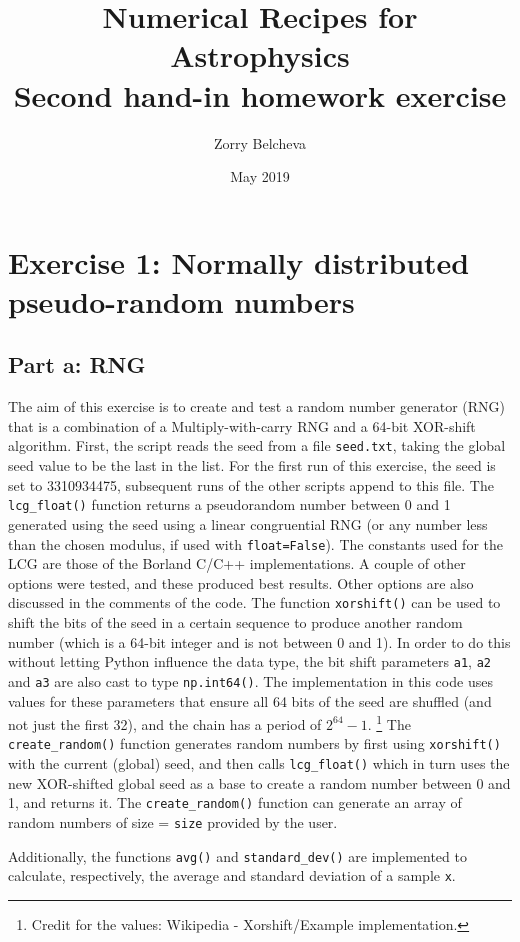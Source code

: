\documentclass{article}
\title{Numerical Recipes for Astrophysics \\ Second hand-in homework exercise}
\author{Zorry Belcheva}
\date{May 2019}
\begin{document}
\maketitle

\section{Exercise 1: Normally distributed pseudo-random numbers}

\subsection{Part a: RNG}
The aim of this exercise is to create and test a random number generator (RNG) that is a combination of a Multiply-with-carry RNG and a 64-bit XOR-shift algorithm. First, the script reads the seed from a file \verb+seed.txt+, taking the global seed value to be the last in the list. For the first run of this exercise, the seed is set to 3310934475, subsequent runs of the other scripts append to this file. The \verb+lcg_float()+ function returns a pseudorandom number between 0 and 1 generated using the seed using a linear congruential RNG (or any number less than the chosen modulus, if used with \verb+float=False+). The constants used for the LCG are those of the Borland C/C++ implementations. A couple of other options were tested, and these produced best results. Other options are also discussed in the comments of the code. The function \verb+xorshift()+ can be used to shift the bits of the seed in a certain sequence to produce another random number (which is a 64-bit integer and is not between 0 and 1). In order  to do this without letting Python influence the data type, the bit shift parameters \verb+a1+, \verb+a2+ and \verb+a3+ are also cast to type \verb+np.int64()+. The implementation in this code uses values for these parameters that ensure all 64 bits of the seed are shuffled (and not just the first 32), and the chain has a period of $2^{64}-1$. \footnote{Credit for the values: Wikipedia - Xorshift/Example implementation.} The \verb+create_random()+ function generates random numbers by first using \verb+xorshift()+ with the current (global) seed, and then calls \verb+lcg_float()+ which in turn uses the new XOR-shifted global seed as a base to create a random number between 0 and 1, and returns it. The \verb+create_random()+ function can generate an array of random numbers of size = \verb+size+ provided by the user. 

Additionally, the functions \verb+avg()+ and \verb+standard_dev()+ are implemented to calculate, respectively, the average and standard deviation of a sample \verb+x+.
\end{document}
